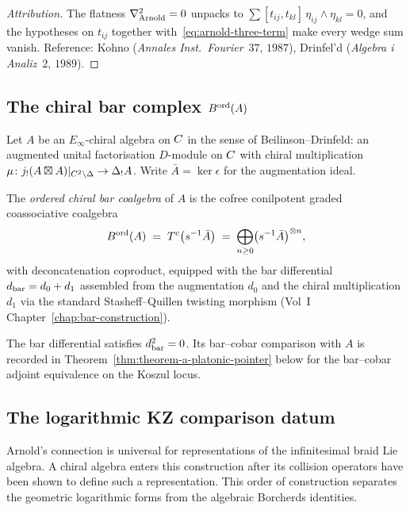 \begin{proof}[Attribution]
The flatness $\nabla_{\mathrm{Arnold}}^{2} = 0$ unpacks to
$\sum [t_{ij}, t_{kl}]\,\eta_{ij}\wedge\eta_{kl} = 0$, and the
hypotheses on $t_{ij}$ together with~\eqref{eq:arnold-three-term}
make every wedge sum vanish. Reference: Kohno (\textit{Annales
Inst.\ Fourier}~$37$, $1987$), Drinfel'd (\textit{Algebra i
Analiz}~$2$, $1989$).
\end{proof}

\subsection{The chiral bar complex $B^{\mathrm{ord}}(A)$}
\label{ssec:climax-platonic-bar}

Let $A$ be an $E_\infty$\nobreakdash-chiral algebra on $C$ in
the sense of Beilinson--Drinfeld: an augmented unital factorisation
$D$\nobreakdash-module on $C$ with chiral multiplication
$\mu \colon j_!(A \boxtimes A)|_{C^{2} \setminus \Delta} \to
\Delta_{!} A$. Write $\bar A = \ker\epsilon$ for the augmentation ideal.

\begin{definition}
\label{def:bar-ord-platonic}
The \emph{ordered chiral bar coalgebra} of $A$ is the cofree conilpotent
graded coassociative coalgebra
\[
 B^{\mathrm{ord}}(A)
 \;=\; T^{c}\bigl(s^{-1}\bar A\bigr)
 \;=\; \bigoplus_{n \geq 0}\bigl(s^{-1}\bar A\bigr)^{\otimes n},
\]
with deconcatenation coproduct, equipped with the bar differential
$d_{\mathrm{bar}} = d_0 + d_1$ assembled from the augmentation $d_0$ and the
chiral multiplication $d_1$ via the standard Stasheff--Quillen
twisting morphism (Vol~I Chapter~\ref{chap:bar-construction}).
\end{definition}

The bar differential satisfies $d_{\mathrm{bar}}^{2} = 0$.  Its bar--cobar
comparison with $A$ is recorded in
Theorem~\ref{thm:theorem-a-platonic-pointer} below for the bar--cobar
adjoint equivalence on the Koszul locus.

\subsection{The logarithmic KZ comparison datum}
\label{ssec:climax-platonic-kz-functor}

Arnold's connection is universal for representations of the
infinitesimal braid Lie algebra.  A chiral algebra enters this
construction after its collision operators have been shown to define
such a representation.  This order of construction separates the
geometric logarithmic forms from the algebraic Borcherds identities.

